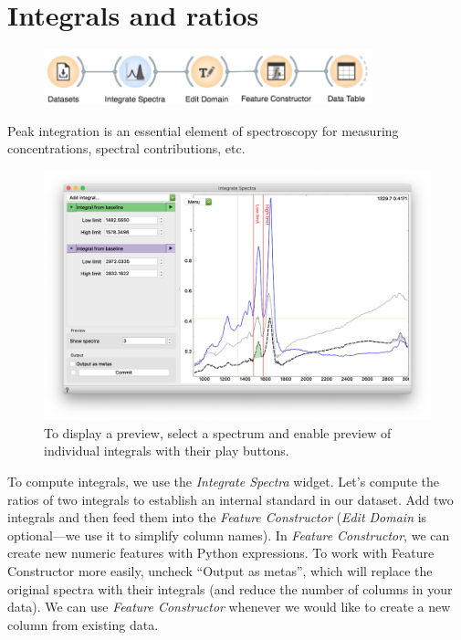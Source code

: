 \chapter{Integrals and ratios}
\label{ch:spectral_preprocessing}


\begin{figure}
    \centering
    \vspace{-3cm}
    \includegraphics[width=0.85\textwidth]{graphics/ch-integrals-ratios/integrals-ratios-fig1.png}
    \label{fig:integrals-ratios-fig1}
\end{figure}

Peak integration is an essential element of spectroscopy for measuring concentrations, spectral contributions, etc. 

\begin{figure}
    \centering
    \includegraphics[width=\textwidth]{graphics/ch-integrals-ratios/integrals-ratios-fig2.png}
    \caption{To display a preview, select a spectrum and enable preview of individual integrals with their play buttons.}
    \label{fig:integrals-ratios-fig2}
\end{figure}

To compute integrals, we use the \textit{Integrate Spectra} widget. Let’s compute the ratios of two integrals to establish an internal standard in our dataset. Add two integrals and then feed them into the \textit{Feature Constructor} (\textit{Edit Domain} is optional—we use it to simplify column names). In \textit{Feature Constructor}, we can create new numeric features with Python expressions.
To work with Feature Constructor more easily, uncheck “Output as metas”, which will replace the original spectra with their integrals (and reduce the number of columns in your data).
We can use \textit{Feature Constructor} whenever we would like to create a new column from existing data. 

